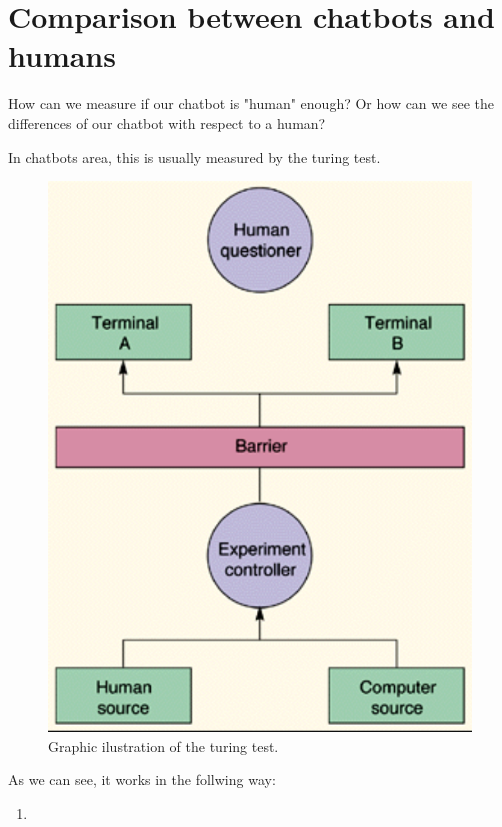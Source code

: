 \documentclass[12pt,twoside]{article}
\theoremstyle{plain}
\theoremstyle{definition}
\theoremstyle{remark}
\begin{document}
\section{Comparison between chatbots and humans}
\label{sec:comparison}

How can we measure if our chatbot is "human" enough? Or how can we see the differences of our chatbot with respect to a human?

In chatbots area, this is usually measured by the turing test.

\begin{figure}[H]
	\centering
	\includegraphics[scale=0.8]{./Pictures/turing_test.png}
	\caption{Graphic ilustration of the turing test.}
	\label{fig::turing_test} 
\end{figure}

As we can see, it works in the follwing way:

\begin{enumerate}
	\item 
\end{enumerate}
\end{document}
